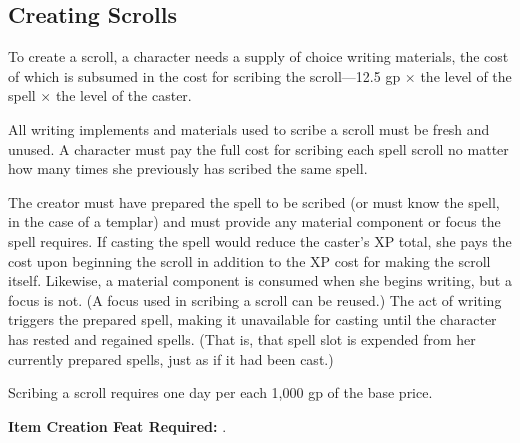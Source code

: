 \subsection{Creating Scrolls}
To create a scroll, a character needs a supply of choice writing materials, the cost of which is subsumed in the cost for scribing the scroll---12.5 gp $\times$ the level of the spell $\times$ the level of the caster.

All writing implements and materials used to scribe a scroll must be fresh and unused. A character must pay the full cost for scribing each spell scroll no matter how many times she previously has scribed the same spell.

The creator must have prepared the spell to be scribed (or must know the spell, in the case of a templar) and must provide any material component or focus the spell requires. If casting the spell would reduce the caster's XP total, she pays the cost upon beginning the scroll in addition to the XP cost for making the scroll itself. Likewise, a material component is consumed when she begins writing, but a focus is not. (A focus used in scribing a scroll can be reused.) The act of writing triggers the prepared spell, making it unavailable for casting until the character has rested and regained spells. (That is, that spell slot is expended from her currently prepared spells, just as if it had been cast.)

Scribing a scroll requires one day per each 1,000 gp of the base price.

\textbf{Item Creation Feat Required:} .


